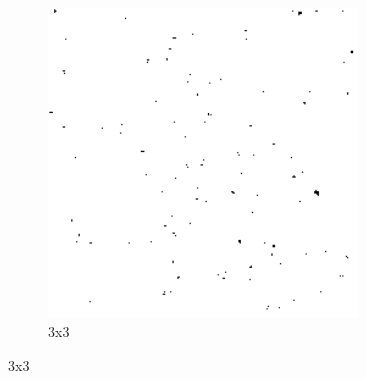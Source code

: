 \begin{figure}[h]
\begin{subfigure}[b]{0.3\textwidth}
        \includegraphics[width=0.9\textwidth]{../code/2_out/2-2_sp_3x3.png}
        \caption{3x3}
        \label{fig:2-2-1:2}
    \end{subfigure}


\end{figure}
